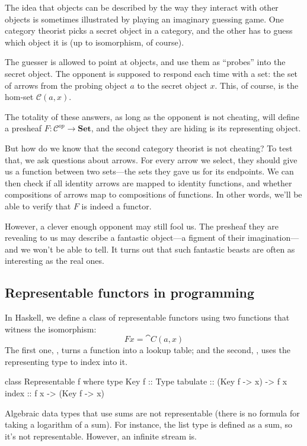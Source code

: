 \documentclass[DaoFP]{subfiles}
\begin{document}
The idea that objects can be described by the way they interact with other objects is sometimes illustrated by playing an imaginary guessing game. One category theorist picks a secret object in a category, and the other has to guess which object it is (up to isomorphism, of course). 

The guesser is allowed to point at objects, and use them as ``probes'' into the secret object. The opponent is supposed to respond each time with a set: the set of arrows from the probing object $a$ to the secret object $x$. This, of course, is the hom-set $\mathcal{C}(a, x)$. 

The totality of these answers, as long as the opponent is not cheating, will define a presheaf $F \colon \mathcal{C}^{op} \to \mathbf{Set}$, and the object they are hiding is its representing object. 

But how do we know that the second category theorist is not cheating? To test that, we ask questions about arrows. For every arrow we select, they should give us a function between two sets---the sets they gave us for its endpoints. We can then check if all identity arrows are mapped to identity functions, and whether compositions of arrows map to compositions of functions. In other words, we'll be able to verify that $F$ is indeed a functor. 

However, a clever enough opponent may still fool us. The presheaf they are revealing to us may describe a fantastic object---a figment of their imagination---and we won't be able to tell. It turns out that such fantastic beasts are often as interesting as the real ones. 

\subsection{Representable functors in programming}

In Haskell, we define a class of representable functors using two functions that witness the isomorphism: 
\[ F x = \cat C(a, x) \]
The first one, , turns a function into a lookup table; and the second, , uses the representing type  to index into it.

\begin{haskell}
class Representable f where
  type Key f :: Type
  tabulate :: (Key f -> x) -> f x
  index    :: f x -> (Key f -> x)
\end{haskell}

Algebraic data types that use sums are not representable (there is no formula for taking a logarithm of a sum). For instance, the list type is defined as a sum, so it's not representable. However, an infinite stream is. 
\end{document}
